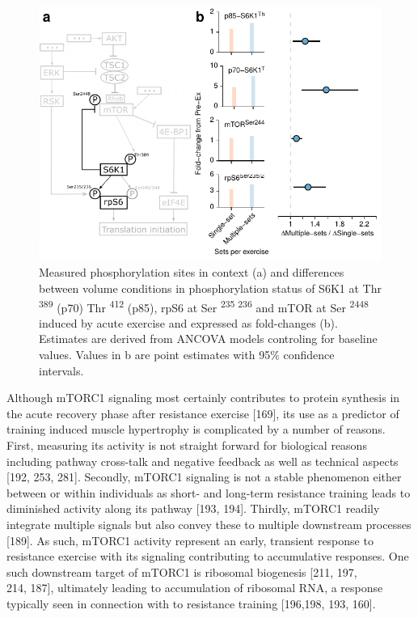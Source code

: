 \documentclass[twoside,10pt]{gihclass} %
\begin{document}
\begin{figure}

{\centering \includegraphics{thesis_files/figure-latex/mtor-fig-1} 

}

\caption[Differences between volume conditions in exercise induced phosphorylation of proteins related to mTORC1 signaling]{Measured phosphorylation sites in context (a) and differences between volume conditions in phosphorylation status of S6K1 at Thr \textsuperscript{389} (p70) Thr \textsuperscript{412} (p85), rpS6 at Ser \textsuperscript{235 236} and mTOR at Ser \textsuperscript{2448} induced by acute exercise and expressed as fold-changes (b). Estimates are derived from ANCOVA models controling for baseline values. Values in b are point estimates with 95\% confidence intervals.}\label{fig:mtor-fig}
\end{figure}
Although mTORC1 signaling most certainly contributes to protein synthesis in the acute recovery phase after resistance exercise {[}169{]},
its use as a predictor of training induced muscle hypertrophy is complicated by a number of reasons.
First, measuring its activity is not straight forward for biological reasons including pathway cross-talk and negative feedback as well as technical aspects
{[}192, 253, 281{]}.
Secondly, mTORC1 signaling is not a stable phenomenon either between or within individuals as short- and long-term resistance training leads to diminished activity along its pathway
{[}193, 194{]}.
Thirdly, mTORC1 readily integrate multiple signals but also convey these to multiple downstream processes
{[}189{]}.
As such, mTORC1 activity represent an early, transient response to resistance exercise with its signaling contributing to accumulative responses.
One such downstream target of mTORC1 is ribosomal biogenesis
{[}211, 197,\\
214, 187{]},
ultimately leading to accumulation of ribosomal RNA, a response typically seen in connection with to resistance training
{[}196,198, 193, 160{]}.
\end{document}
